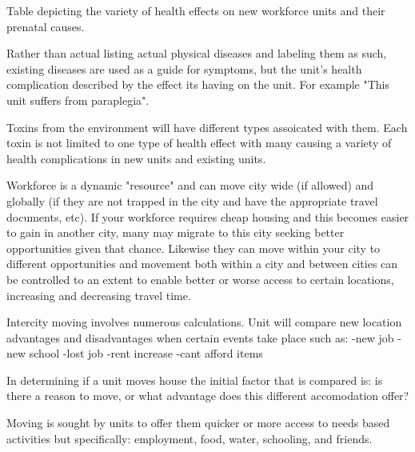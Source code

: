 Table depicting the variety of health effects on new workforce units and their prenatal causes.


Rather than actual listing actual physical diseases and labeling them as such, existing diseases are used as a guide for symptoms, but the unit's health complication described by the effect its having on the unit. For example "This unit suffers from paraplegia".



Toxins from the environment will have different types assoicated with them. Each toxin is not limited to one type of health effect with many causing a variety of health complications in new units and existing units.   



Workforce is a dynamic "resource" and can move city wide (if allowed) and globally (if they are not trapped in the city and have the appropriate travel documents, etc). If your workforce requires cheap housing and this becomes easier to gain in another city, many may migrate to this city seeking better opportunities given that chance. Likewise they can move within your city to different opportunities and movement both within a city and between cities can be controlled to an extent to enable better or worse access to certain locations, increasing and decreasing travel time.


Intercity moving involves numerous calculations. Unit will compare new location advantages and disadvantages when certain events take place such as:
-new job
-new school
-lost job
-rent increase
-cant afford items

In determining if a unit moves house the initial factor that is compared is: is there a reason to move, or what advantage does this different accomodation offer?

Moving is sought by units to offer them quicker or more access to needs based activities but specifically: employment, food, water, schooling, and friends. 

